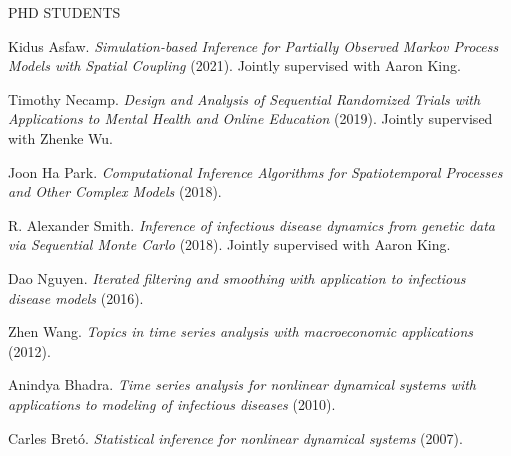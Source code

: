 \begin{reflist}{PHD STUDENTS}

\item{Kidus Asfaw.} {\it Simulation-based Inference for Partially Observed Markov Process Models with Spatial Coupling} (2021). Jointly supervised with Aaron King.

\item{Timothy Necamp.} {\it Design and Analysis of Sequential Randomized Trials with Applications to Mental Health and Online Education} (2019). Jointly supervised with Zhenke Wu. 

\item{Joon Ha Park.} {\it Computational Inference Algorithms for Spatiotemporal Processes and Other Complex Models} (2018). 

 \item{R. Alexander Smith.} {\it Inference of infectious disease dynamics from genetic data via Sequential Monte Carlo} (2018). Jointly supervised with Aaron King. 

 \item{Dao Nguyen.} {\it Iterated filtering and smoothing with application to infectious disease models} (2016). 

\item{Zhen Wang.} {\it Topics in time series analysis with macroeconomic applications} (2012). 

\item{Anindya Bhadra.} {\it Time series analysis for nonlinear dynamical systems with applications to modeling of infectious diseases} (2010).

\item{Carles Bret\'{o}.} {\it Statistical inference for nonlinear dynamical systems} (2007). 


\end{reflist}

\lsp

